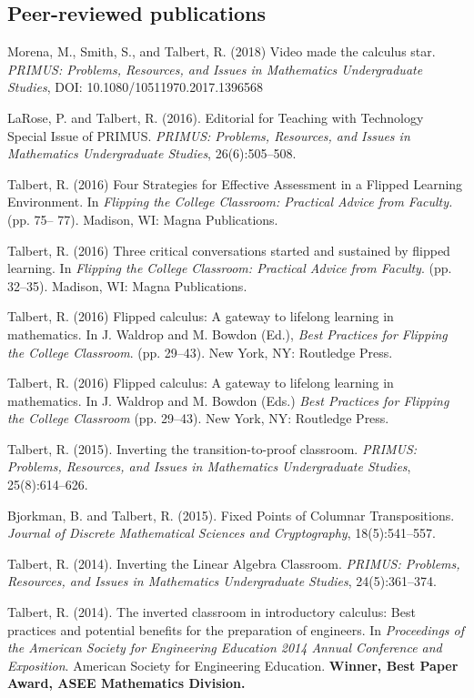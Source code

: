 \documentclass[letterpaper]{article}
\renewenvironment{itemize}{
  \begin{list}{}{
    \setlength{\leftmargin}{1.5em}
	\setlength{\itemsep}{0in}
  }
}{
  \end{list}
}
\begin{document}
\subsection*{Peer-reviewed publications}

\begin{itemize}
	\item Morena, M., Smith, S., and Talbert, R. (2018) Video made the calculus star.  \textit{PRIMUS: Problems, Resources, and Issues in Mathematics Undergraduate Studies},  DOI: 10.1080/10511970.2017.1396568
	\item LaRose, P. and Talbert, R. (2016). Editorial for Teaching with Technology Special Issue of PRIMUS. \textit{PRIMUS: Problems, Resources, and Issues in Mathematics Undergraduate Studies}, 26(6):505--508.
  \item Talbert, R. (2016) Four Strategies for Effective Assessment in a Flipped Learning Environment. In \textit{Flipping the College Classroom: Practical Advice from Faculty.} (pp. 75-- 77). Madison, WI: Magna Publications.
  \item Talbert, R. (2016) Three critical conversations started and sustained by flipped learning. In \textit{Flipping the College Classroom: Practical Advice from Faculty}. (pp. 32--35). Madison, WI: Magna Publications.
  \item Talbert, R. (2016) Flipped calculus: A gateway to lifelong learning in mathematics. In J. Waldrop and M. Bowdon (Ed.), \textit{Best Practices for Flipping the College Classroom}. (pp. 29--43). New York, NY: Routledge Press.
	\item Talbert, R. (2016) Flipped calculus: A gateway to lifelong learning in mathematics. In J. Waldrop and M. Bowdon (Eds.) \textit{Best Practices for Flipping the College Classroom} (pp. 29--43). New York, NY: Routledge Press.
	\item Talbert, R. (2015). Inverting the transition-to-proof classroom. \textit{PRIMUS: Problems, Resources, and Issues in Mathematics Undergraduate Studies}, 25(8):614--626.
	\item Bjorkman, B. and Talbert, R. (2015). Fixed Points of Columnar Transpositions. \textit{Journal of Discrete Mathematical Sciences and Cryptography}, 18(5):541--557.
	\item Talbert, R. (2014). Inverting the Linear Algebra Classroom. \textit{PRIMUS: Problems, Resources, and Issues in Mathematics Undergraduate Studies}, 24(5):361--374.
	\item Talbert, R. (2014). The inverted classroom in introductory calculus: Best practices and potential benefits for the preparation of engineers. In \textit{Proceedings of the American Society for Engineering Education 2014 Annual Conference and Exposition}. American Society for Engineering Education. \textbf{Winner, Best Paper Award, ASEE Mathematics Division.}

\end{itemize}
\end{document}
